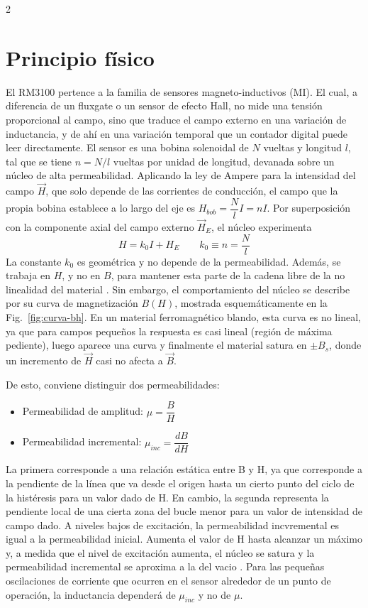 \documentclass[11pt,letterpaper]{article}
\begin{document}
\begin{multicols*}{2}
\section{Principio físico}
El RM3100 pertence a la familia de sensores magneto-inductivos (MI). El cual, a diferencia de un fluxgate o un sensor de efecto Hall, no mide una tensión proporcional al campo, sino que traduce el campo externo en una variación de inductancia, y de ahí en una variación temporal que un contador digital puede leer directamente. 
El sensor es una bobina solenoidal de $N$ vueltas y longitud $l$, tal que se tiene $n = N/l$ vueltas por unidad de longitud, devanada sobre un núcleo de alta permeabilidad. Aplicando la ley de Ampere para la intensidad del campo $\vec{H}$, que solo depende de las corrientes de conducción, el campo que la propia bobina establece a lo largo del eje es $H_{bob} = \dfrac{N}{l}I = n I$. Por superposición con la componente axial del campo externo $\vec{H}_E$, el núcleo experimenta
\begin{equation}
    H = k_0I + H_E \qquad k_0\equiv n = \dfrac{N}{l}
    \label{eq:1}
\end{equation}
La constante $k_0$ es geométrica y no depende de la permeabilidad. Además, se trabaja en $H$, y no en $B$, para mantener esta parte de la cadena libre de la no linealidad del material \citep{leuzinger2010}.
Sin embargo, el comportamiento del núcleo se describe por su curva de magnetización $B(H)$, mostrada esquemáticamente en la Fig.~\ref{fig:curva-bh}. En un material ferromagnético blando, esta curva es no lineal, ya que para campos pequeños la respuesta es casi lineal (región de máxima pediente), luego aparece una curva y finalmente el material satura en $\pm B_s$, donde un incremento de $\vec{H}$ casi no afecta a $\vec{B}$.

De esto, conviene distinguir dos permeabilidades:
\begin{itemize}
    \item Permeabilidad de amplitud: $\mu = \dfrac{B}{H}$
    \item Permeabilidad incremental: $\mu_{inc} = \dfrac{dB}{dH}$
\end{itemize}

La primera corresponde a una relación estática entre B y H, ya que corresponde a la pendiente de la línea que va desde el origen hasta un cierto punto del ciclo de la histéresis para un valor dado de H. En cambio, la segunda representa la pendiente local de una cierta zona del bucle menor para un valor de intensidad de campo dado. A niveles bajos de excitación, la permeabilidad incvremental es igual a la permeabilidad inicial. Aumenta el valor de H hasta alcanzar un máximo y, a medida que el nivel de excitación aumenta, el núcleo se satura y la permeabilidad incremental se aproxima a la del vacio \citep{permeability}. Para las pequeñas oscilaciones de corriente que ocurren en el sensor alrededor de un punto de operación, la inductancia dependerá de $\mu_{inc}$ y no de $\mu$.


\end{multicols*}
\end{document}
